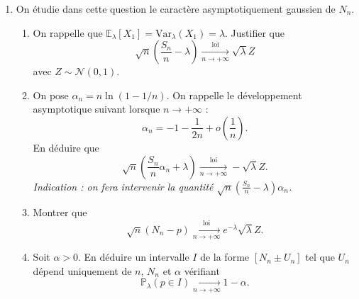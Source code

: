 \begin{mdframed}
\begin{exercice}
\begin{enumerate}
    \item On étudie dans cette question le caractère asymptotiquement gaussien de $N_n$.
    \begin{enumerate}
        \item[i--] On rappelle que $\mathbb{E}_\lambda[X_1] = \text{Var}_\lambda(X_1) = \lambda$. Justifier que
        \begin{equation*}
        \sqrt{n}\left( \frac{S_n}{n} - \lambda \right) \xrightarrow[n \to +\infty]{\text{loi}} \sqrt{\lambda}Z
        \end{equation*}
        avec $Z \sim \mathcal{N}(0, 1)$.
        \item[ii--] On pose $\alpha_n = n \ln(1 - 1/n)$. On rappelle le développement asymptotique suivant lorsque $n \to +\infty$ :
        \begin{equation*}
        \alpha_n = -1 - \frac{1}{2n} + o\left(\frac{1}{n}\right).
        \end{equation*}
        En déduire que
        \begin{equation*}
        \sqrt{n}\left( \frac{S_n}{n}\alpha_n + \lambda \right) \xrightarrow[n \to +\infty]{\text{loi}} -\sqrt{\lambda}Z.
        \end{equation*}
        \textit{Indication : on fera intervenir la quantité $\sqrt{n}\left( \frac{S_n}{n} - \lambda \right)\alpha_n$.}
        \item[iii--] Montrer que
        \begin{equation*}
        \sqrt{n}(N_n - p) \xrightarrow[n \to +\infty]{\text{loi}} e^{-\lambda}\sqrt{\lambda}Z.
        \end{equation*}
        \item[iv--] Soit $\alpha > 0$. En déduire un intervalle $I$ de la forme $[N_n \pm U_n]$ tel que $U_n$ dépend uniquement de $n$, $N_n$ et $\alpha$ vérifiant
        \begin{equation*}
        \mathbb{P}_\lambda(p \in I) \xrightarrow[n \to +\infty]{} 1 - \alpha.
        \end{equation*}
    \end{enumerate}
\end{enumerate}
\end{exercice}
\end{mdframed}

\smallskip

